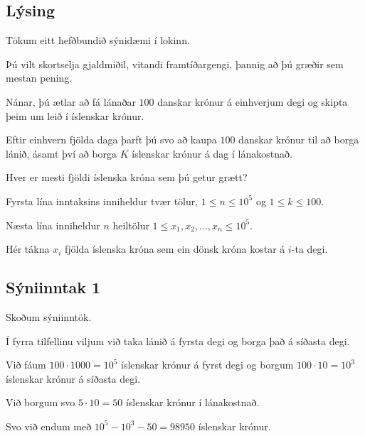 \subsection{Lýsing}
{
    {
        \item<1-> Tökum eitt hefðbundið sýnidæmi í lokinn.
        \item<2-> Þú vilt skortselja gjaldmiðil, vitandi framtíðargengi, þannig að þú græðir sem mestan pening.
        \item<3-> Nánar, þú ætlar að fá lánaðar $100$ danskar krónur á einhverjum degi og skipta þeim um leið í íslenskar krónur.
        \item<4-> Eftir einhvern fjölda daga þarft þú svo að kaupa $100$ danskar krónur til að borga lánið,
                    ásamt því að borga $K$ íslenskar krónur á dag í lánakostnað.
        \item<5-> Hver er mesti fjöldi íslenska króna sem þú getur grætt?
        \item<6-> Fyrsta lína inntaksins inniheldur tvær tölur, $1 \leq n \leq 10^5$ og $1 \leq k \leq 100$.
        \item<7-> Næsta lína inniheldur $n$ heiltölur $1 \leq x_1, x_2, ..., x_n \leq 10^5$.
        \item<8-> Hér tákna $x_i$ fjölda íslenska króna sem ein dönsk króna kostar á $i$-ta degi.
    }
}

\subsection{Sýniinntak 1}
{
    {
        \item<1-> Skoðum sýniinntök.
        \item<2->[]
        \item<3-> Í fyrra tilfellinu viljum við taka lánið á fyrsta degi og borga það á síðasta degi.
        \item<4-> Við fáum $100 \cdot 1000 = 10^5$ íslenskar krónur á fyrst degi og borgum $100 \cdot 10 = 10^3$ íslenskar krónur á síðasta degi.
        \item<5-> Við borgum svo $5 \cdot 10 = 50$ íslenskar krónur í lánakostnað.
        \item<6-> Svo við endum með $10^5 - 10^3 - 50 = 98950$ íslenskar krónur.
    }
}

